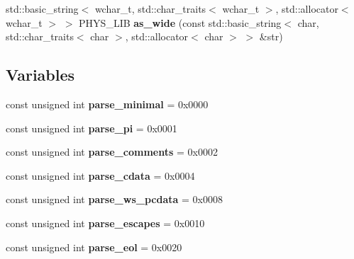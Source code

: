 \begin{DoxyCompactItemize}
\item 
\hypertarget{namespacephys_1_1xml_af41ba8af3ca7a47c95124ba5e0347501}{
std::basic\_\-string$<$ wchar\_\-t, std::char\_\-traits$<$ wchar\_\-t $>$, std::allocator$<$ wchar\_\-t $>$ $>$ PHYS\_\-LIB {\bfseries as\_\-wide} (const std::basic\_\-string$<$ char, std::char\_\-traits$<$ char $>$, std::allocator$<$ char $>$ $>$ \&str)}
\label{d9/d27/namespacephys_1_1xml_af41ba8af3ca7a47c95124ba5e0347501}

\end{DoxyCompactItemize}
\subsection*{Variables}
\begin{DoxyCompactItemize}
\item 
\hypertarget{namespacephys_1_1xml_af314970463b7be68809dcc1dcdc0a490}{
const unsigned int {\bfseries parse\_\-minimal} = 0x0000}
\label{d9/d27/namespacephys_1_1xml_af314970463b7be68809dcc1dcdc0a490}

\item 
\hypertarget{namespacephys_1_1xml_a97d216891f6a01ac5f55aca3a5599830}{
const unsigned int {\bfseries parse\_\-pi} = 0x0001}
\label{d9/d27/namespacephys_1_1xml_a97d216891f6a01ac5f55aca3a5599830}

\item 
\hypertarget{namespacephys_1_1xml_ab706a4f00bc8abe3ac224394df56f354}{
const unsigned int {\bfseries parse\_\-comments} = 0x0002}
\label{d9/d27/namespacephys_1_1xml_ab706a4f00bc8abe3ac224394df56f354}

\item 
\hypertarget{namespacephys_1_1xml_a670bb64322a756b39c5b23413f00f6e1}{
const unsigned int {\bfseries parse\_\-cdata} = 0x0004}
\label{d9/d27/namespacephys_1_1xml_a670bb64322a756b39c5b23413f00f6e1}

\item 
\hypertarget{namespacephys_1_1xml_ab417d04b168665d53eb615ef4576c612}{
const unsigned int {\bfseries parse\_\-ws\_\-pcdata} = 0x0008}
\label{d9/d27/namespacephys_1_1xml_ab417d04b168665d53eb615ef4576c612}

\item 
\hypertarget{namespacephys_1_1xml_ab006f38b0cb2a1a394b282b3ac6a55d8}{
const unsigned int {\bfseries parse\_\-escapes} = 0x0010}
\label{d9/d27/namespacephys_1_1xml_ab006f38b0cb2a1a394b282b3ac6a55d8}

\item 
\hypertarget{namespacephys_1_1xml_a1f79781a10053699798e9318d6f68c8a}{
const unsigned int {\bfseries parse\_\-eol} = 0x0020}
\label{d9/d27/namespacephys_1_1xml_a1f79781a10053699798e9318d6f68c8a}


\end{DoxyCompactItemize}
